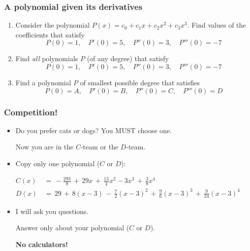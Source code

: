 \documentclass[14pt]{beamer}
\begin{document}
	\begin{frame}[t]
		\fontsize{13}{13}\selectfont
		\frametitle{A polynomial given its derivatives}

		\begin{enumerate}
			\item Consider the polynomial $\displaystyle P(x)= c_{0}+ c_{1}x + c_{2}x^{2}
				+ c_{3}x^{3}$. Find values of the coefficients that satisfy
				\[
					P(0) = 1, \quad P'(0) = 5, \quad P''(0) = 3, \quad P'''(0) = -7
				\]

			\item Find \emph{all} polynomials $P$ (of any degree) that satisfy
				\[
					P(0) = 1, \quad P'(0) = 5, \quad P''(0) = 3, \quad P'''(0) = -7
				\]

			\item Find a polynomial $P$ of smallest possible degree that satisfies
				\[
					P(0) = A, \quad P'(0) = B, \quad P''(0) = C, \quad P'''(0) = D
				\]
		\end{enumerate}
	\end{frame}

	\begin{frame}[t]
		\frametitle{Competition!}

		\begin{itemize}
			\item Do you prefer cats or dogs? You MUST choose one.

				Now you are in the $C$-team or the $D$-team.


			\item Copy only one polynomial ($C$ or $D$):
		\end{itemize}
		{\fontsize{13}{13}\selectfont \begin{align*}C(x)&\, = \, -\frac{293}{8}\, + \, 29x \, + \, \frac{13}{4}x^{2}-3x^{3}\, + \, \frac{3}{8}x^{4}\phantom{\int}\\ D(x)&\, = \, 29 \, + \, 8(x -3) \, - \, \frac{7}{2}(x-3)^{2}\, + \, \frac{9}{6}(x-3)^{3}\, + \, \frac{9}{24}(x-3)^{4}\end{align*} }
		\begin{itemize}
			\item I will ask you questions.

				Answer only about your polynomial ($C$ or $D$).

				{\bfseries No calculators!}
		\end{itemize}
	\end{frame}
\end{document}
